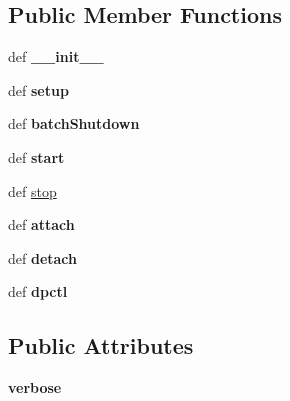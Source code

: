 \subsection*{Public Member Functions}
\begin{DoxyCompactItemize}
\item 
\hypertarget{classmininet_1_1node_1_1IVSSwitch_ace8ef0e200291a6e571eda63da6e3b93}{def {\bfseries \-\_\-\-\_\-init\-\_\-\-\_\-}}\label{classmininet_1_1node_1_1IVSSwitch_ace8ef0e200291a6e571eda63da6e3b93}

\item 
\hypertarget{classmininet_1_1node_1_1IVSSwitch_aefc15cf7c00e207ccbc7d1f26eb0026c}{def {\bfseries setup}}\label{classmininet_1_1node_1_1IVSSwitch_aefc15cf7c00e207ccbc7d1f26eb0026c}

\item 
\hypertarget{classmininet_1_1node_1_1IVSSwitch_a9a235470aa2a49e4b5723b5d2d3eca4b}{def {\bfseries batch\-Shutdown}}\label{classmininet_1_1node_1_1IVSSwitch_a9a235470aa2a49e4b5723b5d2d3eca4b}

\item 
\hypertarget{classmininet_1_1node_1_1IVSSwitch_a149829cffa57ee9966e80953eadb5525}{def {\bfseries start}}\label{classmininet_1_1node_1_1IVSSwitch_a149829cffa57ee9966e80953eadb5525}

\item 
def \hyperlink{classmininet_1_1node_1_1IVSSwitch_a13e63d817d45a1dccce950912adb4764}{stop}
\item 
\hypertarget{classmininet_1_1node_1_1IVSSwitch_af84594ca4a70b42c93aa089791503992}{def {\bfseries attach}}\label{classmininet_1_1node_1_1IVSSwitch_af84594ca4a70b42c93aa089791503992}

\item 
\hypertarget{classmininet_1_1node_1_1IVSSwitch_a52b3b881f18a03f4a6c290c3b58036b6}{def {\bfseries detach}}\label{classmininet_1_1node_1_1IVSSwitch_a52b3b881f18a03f4a6c290c3b58036b6}

\item 
\hypertarget{classmininet_1_1node_1_1IVSSwitch_aac48ff3172eab783da28da5c5dcb7aaf}{def {\bfseries dpctl}}\label{classmininet_1_1node_1_1IVSSwitch_aac48ff3172eab783da28da5c5dcb7aaf}

\end{DoxyCompactItemize}
\subsection*{Public Attributes}
\begin{DoxyCompactItemize}
\item 
\hypertarget{classmininet_1_1node_1_1IVSSwitch_aa3953504c611d5309e888eb1b1be8f9b}{{\bfseries verbose}}\label{classmininet_1_1node_1_1IVSSwitch_aa3953504c611d5309e888eb1b1be8f9b}

\end{DoxyCompactItemize}
